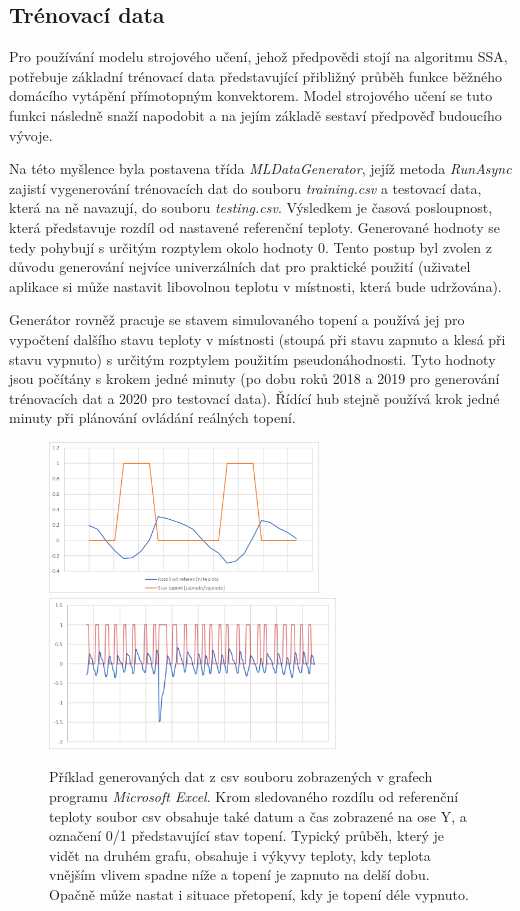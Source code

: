 \subsection{Trénovací data}
Pro používání modelu strojového učení, jehož předpovědi stojí na algoritmu SSA, potřebuje základní trénovací data představující přibližný průběh funkce běžného domácího vytápění přímotopným konvektorem. Model strojového učení se tuto funkci následně snaží napodobit a na jejím základě sestaví předpověď budoucího vývoje.

Na této myšlence byla postavena třída {\it MLDataGenerator}, jejíž metoda {\it RunAsync} zajistí vygenerování trénovacích dat do souboru {\it training.csv} a testovací data, která na ně navazují, do souboru {\it testing.csv}. Výsledkem je časová posloupnost, která představuje rozdíl od nastavené referenční teploty. Generované hodnoty se tedy pohybují s určitým rozptylem okolo hodnoty 0. Tento postup byl zvolen z důvodu generování nejvíce univerzálních dat pro praktické použití (uživatel aplikace si může nastavit libovolnou teplotu v místnosti, která bude udržována).

Generátor rovněž pracuje se stavem simulovaného topení a používá jej pro vypočtení dalšího stavu teploty v místnosti (stoupá při stavu zapnuto a klesá při stavu vypnuto) s určitým rozptylem použitím pseudonáhodnosti. Tyto hodnoty jsou počítány s krokem jedné minuty (po dobu roků 2018 a 2019 pro generování trénovacích dat a 2020 pro testovací data). Řídící hub stejně používá krok jedné minuty při plánování ovládání reálných topení.

\begin{figure}[hbt]
\centering
\includegraphics[height=4cm]{obrazky-figures/mlgen_1.png}
\includegraphics[height=4cm]{obrazky-figures/mlgen_2.png}
\caption{Příklad generovaných dat z csv souboru zobrazených v grafech programu {\it Microsoft Excel}. Krom sledovaného rozdílu od referenční teploty soubor csv obsahuje také datum a čas zobrazené na ose Y, a označení 0/1 představující stav topení. Typický průběh, který je vidět na druhém grafu, obsahuje i výkyvy teploty, kdy teplota vnějším vlivem spadne níže a topení je zapnuto na delší dobu. Opačně může nastat i situace přetopení, kdy je topení déle vypnuto.}
\end{figure}

